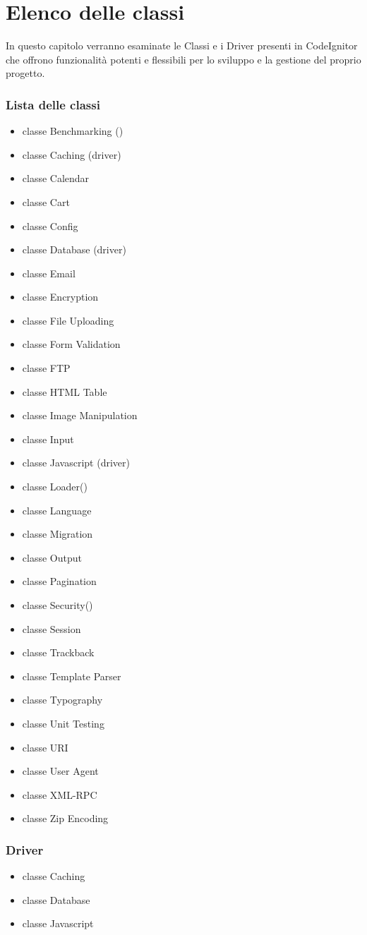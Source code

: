 \chapter{Elenco delle classi}
\label{cap:elencoclassi}

In questo capitolo verranno esaminate le Classi e i Driver presenti in CodeIgnitor che offrono funzionalità potenti e flessibili per lo sviluppo e la gestione del proprio progetto.

\subsection*{Lista delle classi}

\begin{itemize}
\item classe Benchmarking ()
\item classe Caching (driver)
\item classe Calendar
\item classe Cart
\item classe Config
\item classe Database (driver)
\item classe Email
\item classe Encryption
\item classe File Uploading
\item classe Form Validation
\item classe FTP
\item classe HTML Table
\item classe Image Manipulation
\item classe Input
\item classe Javascript (driver)
\item classe Loader()
\item classe Language
\item classe Migration
\item classe Output
\item classe Pagination
\item classe Security()
\item classe Session
\item classe Trackback
\item classe Template Parser
\item classe Typography
\item classe Unit Testing
\item classe URI
\item classe User Agent
\item classe XML-RPC
\item classe Zip Encoding
\end{itemize}

\subsection*{Driver}

\begin{itemize}
\item classe Caching
\item classe Database
\item classe Javascript
\end{itemize}